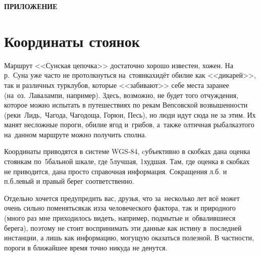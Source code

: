 {
\cleardoublepage
{}
{}
{\hfill\large\textbf{ПРИЛОЖЕНИЕ}}
\section*{Координаты стоянок}
Маршрут <<Сунская цепочка>> достаточно хорошо известен, хожен. На р.\nobreakdash~Суна уже часто не протолкнуться на~стоянках\mdash идёт обилие как <<дикарей>>, так и различных турклубов, которые <<забивают>> себе места заранее (на~оз.\nobreakdash~Лавалампи, например). Здесь, возможно, не будет того отчуждения, которое можно испытать в путешествиях по рекам Вепсовской возвышенности (реки~Лидь,~Чагода, Чагодоща, Горюн, Песь\cite{СоболевВепсскаяЛетопись}), но люди идут сюда не за этим. Их манят несложные пороги, обилие ягод и~грибов, а~также олтичная рыбалка\mdash этого на~данном маршруте можно получить сполна. 

Координаты приводятся в системе WGS-84, cубъективно в скобках дана оценка стоянкам по~5\sdash бальной шкале, где 5\mdash лучшая, 1\mdash худшая. Там, где оценка в скобках не приводится, дана просто справочная информация. Сокращения л.б. и п.б.\mdash левый и правый берег соответственно.

Отдельно хочется предупредить вас, друзья, что за~несколько лет всё может очень сильно поменяться\mdash как из\sdash за человеческого фактора, так и природного (много раз мне приходилось видеть, например, подмытые и~обвалившиеся берега), поэтому не стоит воспринимать эти данные как истину в~последней инстанции, а лишь как информацию, могущую оказаться полезной. В частности, пороги в ближайшее время точно никуда не денутся.
%
\newpage 
}
